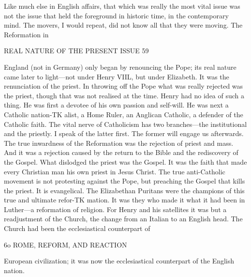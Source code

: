 \documentclass[12pt,a5paper,oneside]{book}
\begin{document}
Like much else in English affairs, that which was 
really the most vital issue was not the issue that held 
the foreground in historic time, in the contemporary 
mind. The movers, I would repeat, did not know 
all that they were moving. The Reformation in 



REAL NATURE OF THE PRESENT ISSUE 59 

England (not in Germany) only began by renouncing 
the Pope; its real nature came later to light---not 
under Henry VIIL, but under Elizabeth. It was the 
renunciation of the priest. In throwing off the Pope 
what was really rejected was the priest, though that 
was not realised at the time. Henry had no idea of 
such a thing. He was first a devotee of his own 
passion and self-will. He was next a Catholic nation-TK
alist, a Home Ruler, an Anglican Catholic, a defender 
of the Catholic faith. The vital nerve of Catholicism 
has two branches---the institutional and the priestly. 
I speak of the latter first. The former will engage us 
afterwards. The true inwardness of the Reformation 
was the rejection of priest and mass. And it was a 
rejection caused by the return to the Bible and the 
rediscovery of the Gospel. What dislodged the priest 
was the Gospel. It was the faith that made every 
Christian man his own priest in Jesus Christ. The 
true anti-Catholic movement is not protesting against 
the Pope, but preaching the Gospel that kills the 
priest. It is evangelical. The Elizabethan Puritans 
were the champions of this true and ultimate refor-TK
mation. It was they who made it what it had been 
in Luther---a reformation of religion. For Henry and 
his satellites it was but a readjustment of the Church, 
the change from an Italian to an English head. The 
Church had been the ecclesiastical counterpart of 



6o ROME, REFORM, AND REACTION 

European civilization; it was now the ecclesiastical 
counterpart of the English nation. 
\end{document}
